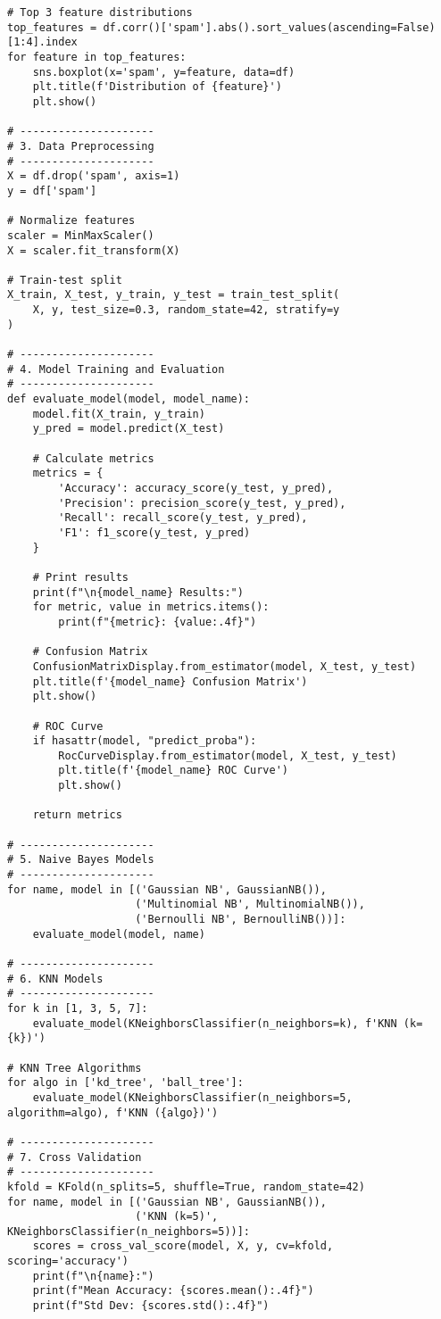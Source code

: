 \documentclass[12pt]{article}
\begin{document}
\begin{verbatim}
# Top 3 feature distributions
top_features = df.corr()['spam'].abs().sort_values(ascending=False)[1:4].index
for feature in top_features:
    sns.boxplot(x='spam', y=feature, data=df)
    plt.title(f'Distribution of {feature}')
    plt.show()

# ---------------------
# 3. Data Preprocessing
# ---------------------
X = df.drop('spam', axis=1)
y = df['spam']

# Normalize features
scaler = MinMaxScaler()
X = scaler.fit_transform(X)

# Train-test split
X_train, X_test, y_train, y_test = train_test_split(
    X, y, test_size=0.3, random_state=42, stratify=y
)

# ---------------------
# 4. Model Training and Evaluation
# ---------------------
def evaluate_model(model, model_name):
    model.fit(X_train, y_train)
    y_pred = model.predict(X_test)

    # Calculate metrics
    metrics = {
        'Accuracy': accuracy_score(y_test, y_pred),
        'Precision': precision_score(y_test, y_pred),
        'Recall': recall_score(y_test, y_pred),
        'F1': f1_score(y_test, y_pred)
    }

    # Print results
    print(f"\n{model_name} Results:")
    for metric, value in metrics.items():
        print(f"{metric}: {value:.4f}")

    # Confusion Matrix
    ConfusionMatrixDisplay.from_estimator(model, X_test, y_test)
    plt.title(f'{model_name} Confusion Matrix')
    plt.show()

    # ROC Curve
    if hasattr(model, "predict_proba"):
        RocCurveDisplay.from_estimator(model, X_test, y_test)
        plt.title(f'{model_name} ROC Curve')
        plt.show()

    return metrics

# ---------------------
# 5. Naive Bayes Models
# ---------------------
for name, model in [('Gaussian NB', GaussianNB()),
                    ('Multinomial NB', MultinomialNB()),
                    ('Bernoulli NB', BernoulliNB())]:
    evaluate_model(model, name)

# ---------------------
# 6. KNN Models
# ---------------------
for k in [1, 3, 5, 7]:
    evaluate_model(KNeighborsClassifier(n_neighbors=k), f'KNN (k={k})')

# KNN Tree Algorithms
for algo in ['kd_tree', 'ball_tree']:
    evaluate_model(KNeighborsClassifier(n_neighbors=5, algorithm=algo), f'KNN ({algo})')

# ---------------------
# 7. Cross Validation
# ---------------------
kfold = KFold(n_splits=5, shuffle=True, random_state=42)
for name, model in [('Gaussian NB', GaussianNB()),
                    ('KNN (k=5)', KNeighborsClassifier(n_neighbors=5))]:
    scores = cross_val_score(model, X, y, cv=kfold, scoring='accuracy')
    print(f"\n{name}:")
    print(f"Mean Accuracy: {scores.mean():.4f}")
    print(f"Std Dev: {scores.std():.4f}")
\end{verbatim}
\end{document}

